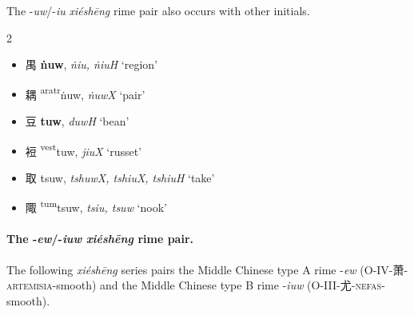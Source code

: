 The -\textit{uw}/-\textit{iu} \textit{xiéshēng} rime pair also occurs with other initials.  

\begin{multicols}{2}

\begin{itemize}

    \item {\Large{禺}} %
    {\large{\textbf{ṅuw}}},
    \textit{ṅiu, ṅiuH} `region'        %

    \item {\Large{耦}} %
    {\large{{\textsuperscript{aratr}}ṅuw}},
    \textit{ṅuwX} `pair'        %

\end{itemize}


\medskip

\begin{itemize}

    \item {\Large{豆}} %
    {\large{\textbf{tuw}}},
    \textit{duwH} `bean'        %

    \item {\Large{裋}} %
    {\large{{\textsuperscript{vest}}tuw}},
    \textit{jiuX} `russet'        %

\end{itemize}

\medskip

\begin{itemize}

    \item {\Large{取}} %
    {\large{tsuw}},
    \textit{tshuwX, tshiuX, tshiuH} `take'        %

    \item {\Large{陬}} %
    {\large{{\textsuperscript{tum}}tsuw}},
    \textit{tsiu, tsuw} `nook'        %

\end{itemize}


\end{multicols}



\paragraph{The -\textit{ew}/-\textit{iuw} \textit{xiéshēng} rime pair.}
\label{par:ew-iuw-XS-pair}
The following \textit{xiéshēng} series pairs the Middle Chinese type A rime -\textit{ew} (O-IV-萧-\textsc{artemisia}-smooth) and the Middle Chinese type B rime -\textit{iuw} (O-III-尤-\textsc{nefas}-smooth). 


